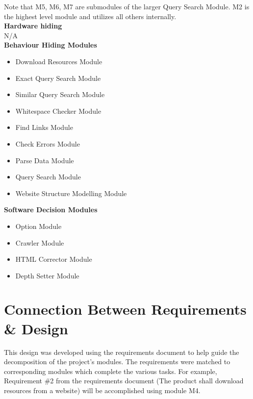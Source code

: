 \documentclass[titlepage]{article}
\begin{document}
Note that M5, M6, M7 are submodules of the larger Query Search Module. M2 is the highest level module and utilizes all others internally.\\

\textbf{Hardware hiding}\\

N/A\\

\textbf{Behaviour Hiding Modules}

\begin{itemize}
\item{Download Resources Module}\\
\item{Exact Query Search Module}\\
\item{Similar Query Search Module}\\
\item{Whitespace Checker Module}\\
\item{Find Links Module}\\
\item{Check Errors Module}\\
\item{Parse Data Module}\\
\item{Query Search Module}\\
\item{Website Structure Modelling Module}\\
\end{itemize}

\textbf{Software Decision Modules}

\begin{itemize}
\item{Option Module}\\
\item{Crawler Module}\\
\item{HTML Corrector Module}\\
\item{Depth Setter Module}\\
\end{itemize}


\section{Connection Between Requirements \& Design}

This design was developed using the requirements document to help guide the decomposition of the project's modules. The requirements were matched to corresponding modules which complete the various tasks. For example, Requirement \#2 from the requirements document (The product shall download resources from a website) will be accomplished using module M4.
\end{document}
